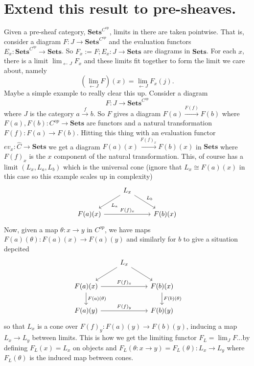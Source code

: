 \documentclass[12pt]{article}
\newcommand{\from}{\colon}
\newcommand{\xto}[1]{\xrightarrow{#1}}
\renewcommand{\(}{\left(}
\renewcommand{\)}{\right)}
\renewcommand{\{}{\left\lbrace}
\renewcommand{\}}{\right\rbrace}
\theoremstyle{remark}
\theoremstyle{definition}
\begin{document}
\section*{Extend this result to pre-sheaves.}

Given a pre-sheaf category, $\mathbf{Sets}^{C^{\text{op}}}$, limits in there are taken pointwise.  That is, consider a diagram $F \from J \to \mathbf{Sets}^{C^{op}}$ and the evaluation functors $E_x \from \mathbf{Sets}^{C^{op}} \to \mathbf{Sets}$. So $F_x:=F ; E_x \from J \to \mathbf{Sets}$ are diagrams in $\mathbf{Sets}$. For each $x$, there is a limit $\lim_{\leftarrow J}F_x$ and these limits fit together to form the limit we care about, namely
\[ 
	(\lim_{\leftarrow J} F)(x) = \lim_{\leftarrow J} F_x(j).
\]
Maybe a simple example to really clear this up. Consider a diagram
\[
	F \from J \to \mathbf{Sets}^{C^{op}}
\]
where $J$ is the category $a \xrightarrow{f} b$.  So $F$ gives a diagram $F(a) \xto{F(f)} F(b)$ where $F(a),F(b)\from C^{op} \to \mathbf{Sets}$ are functors and a natural transformation $F(f) \from F(a) \to F(b)$.  Hitting this thing with an evaluation functor $ev_x \from \widehat{C} \to \mathbf{Sets}$ we get a diagram $F(a)(x) \xto{F(f)_x} F(b)(x)$ in $\mathbf{Sets}$ where $F(f)_x$ is the $x$ component of the natural transformation.  This, of course has a limit $(L_x,L_a,L_b)$ which is the universal cone (ignore that $L_x \cong F(a)(x)$ in this case so this example scales up in complexity)
\[
	\begin{tikzcd}
		{} &
		{L_x} \ar[dl,"L_a"] \ar[dr,"L_b"]&
		{} \\
		{F(a)(x)} \ar[rr,"F(f)_x"] &
		{} &
		{F(b)(x)} 
	\end{tikzcd}
\]
Now, given a map $\theta \from x \to y$ in $C^{op}$, we have maps $F(a)(\theta) \from F(a)(x) \to F(a)(y)$ and similarly for $b$ to give a situation depcited
\[
	\begin{tikzcd}
		{} &
		{L_x} 
			\ar[dr]
			\ar[dl] &
		{} \\
		{F(a)(x)} 
			\ar[rr, "F(f)_x"] 
			\ar[d, "F(a)(\theta)"]&
		{} &
		{F(b)(x)} 
			\ar[d, "F(b)(\theta)"]\\
		{F(a)(y)} 
			\ar[rr, "F(f)_y"] &
		{} &
		{F(b)(y)} 
	\end{tikzcd}
\] 
so that $L_x$ is a cone over $F(f)_y \from F(a)(y) \to F(b)(y)$, inducing a map $L_x \to L_y$ between limits. This is how we get the limiting functor $F_L = \lim_{J} F$...by defining $F_L (x) = L_x$ on objects and $F_L(\theta \from x \to y) = F_L(\theta) \from L_x \to L_y$ where $F_L (\theta)$ is the induced map between cones.  
\end{document}
